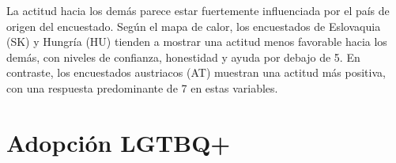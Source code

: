 \documentclass{article}
\begin{document}
La actitud hacia los demás parece estar fuertemente influenciada por el país de origen del encuestado. Según el mapa de calor, los encuestados de Eslovaquia (SK) y Hungría (HU) tienden a mostrar una actitud menos favorable hacia los demás, con niveles de confianza, honestidad y ayuda por debajo de 5. En contraste, los encuestados austriacos (AT) muestran una actitud más positiva, con una respuesta predominante de 7 en estas variables.


\section{Adopción LGTBQ+}

\end{document}
